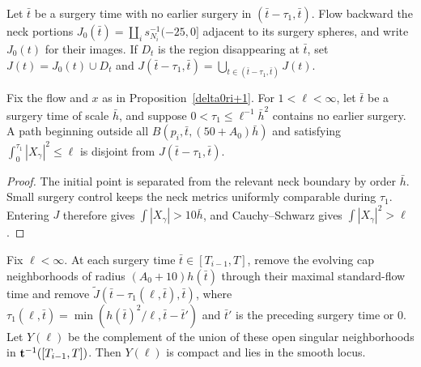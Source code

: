 \begin{definition}
\label{def:disappearing-region-J}
\label{J}
Let $\bar t$ be a surgery time with no earlier surgery in $(\bar t-\tau_1,\bar t)$. Flow backward the neck portions $J_0(\bar t)=\coprod_i s_{N_i}^{-1}(-25,0]$ adjacent to its surgery spheres, and write $J_0(t)$ for their images. If $D_t$ is the region disappearing at $\bar t$, set $J(t)=J_0(t)\cup D_t$ and $J(\bar t-\tau_1,\bar t)=\bigcup_{t\in(\bar t-\tau_1,\bar t)}J(t)$.
\end{definition}

\begin{lemma}
\label{lem:short-energy-avoids-disappearing-region}
\label{15.17}
Fix the flow and $x$ as in Proposition~\ref{delta0ri+1}. For $1<\ell<\infty$, let $\bar t$ be a surgery time of scale $\bar h$, and suppose $0<\tau_1\leq\ell^{-1}\bar h^2$ contains no earlier surgery. A path beginning outside all $B(p_i,\bar t,(50+A_0)\bar h)$ and satisfying $\int_0^{\tau_1}|X_\gamma|^2\leq\ell$ is disjoint from $J(\bar t-\tau_1,\bar t)$.
\end{lemma}
\begin{proof}
\sketch The initial point is separated from the relevant neck boundary by order $\bar h$. Small surgery control keeps the neck metrics uniformly comparable during $\tau_1$. Entering $J$ therefore gives $\int|X_\gamma|>10\bar h$, and Cauchy--Schwarz gives $\int|X_\gamma|^2>\ell$.
\end{proof}

\begin{definition}
\label{def:compact-subset-Y-ell}

Fix $\ell<\infty$. At each surgery time $\bar t\in[T_{i-1},T]$, remove the evolving cap neighborhoods of radius $(A_0+10)h(\bar t)$ through their maximal standard-flow time and remove $\widetilde J(\bar t-\tau_1(\ell,\bar t),\bar t)$, where $\tau_1(\ell,\bar t)=\min(h(\bar t)^2/\ell,\bar t-\bar t')$ and $\bar t'$ is the preceding surgery time or $0$. Let $Y(\ell)$ be the complement of the union of these open singular neighborhoods in ${\bf t}^{-1}([T_{i-1},T])$. Then $Y(\ell)$ is compact and lies in the smooth locus.
\end{definition}

